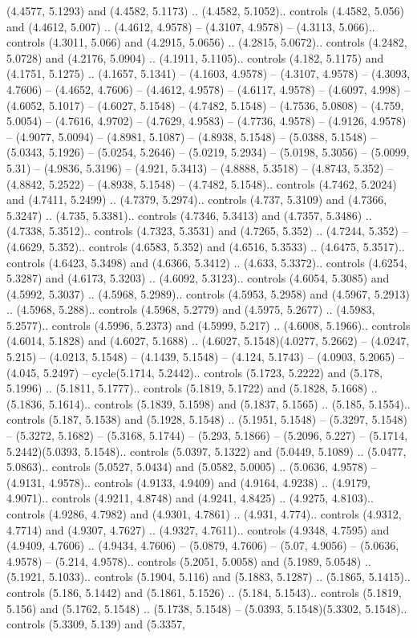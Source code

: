 (4.4577, 5.1293) and (4.4582, 5.1173) .. (4.4582, 5.1052).. controls (4.4582, 5.056) and (4.4612, 5.007) .. (4.4612, 4.9578) -- (4.3107, 4.9578) -- (4.3113, 5.066).. controls (4.3011, 5.066) and (4.2915, 5.0656) .. (4.2815, 5.0672).. controls (4.2482, 5.0728) and (4.2176, 5.0904) .. (4.1911, 5.1105).. controls (4.182, 5.1175) and (4.1751, 5.1275) .. (4.1657, 5.1341) -- (4.1603, 4.9578) -- (4.3107, 4.9578) -- (4.3093, 4.7606) -- (4.4652, 4.7606) -- (4.4612, 4.9578) -- (4.6117, 4.9578) -- (4.6097, 4.998) -- (4.6052, 5.1017) -- (4.6027, 5.1548) -- (4.7482, 5.1548) -- (4.7536, 5.0808) -- (4.759, 5.0054) -- (4.7616, 4.9702) -- (4.7629, 4.9583) -- (4.7736, 4.9578) -- (4.9126, 4.9578) -- (4.9077, 5.0094) -- (4.8981, 5.1087) -- (4.8938, 5.1548) -- (5.0388, 5.1548) -- (5.0343, 5.1926) -- (5.0254, 5.2646) -- (5.0219, 5.2934) -- (5.0198, 5.3056) -- (5.0099, 5.31) -- (4.9836, 5.3196) -- (4.921, 5.3413) -- (4.8888, 5.3518) -- (4.8743, 5.352) -- (4.8842, 5.2522) -- (4.8938, 5.1548) -- (4.7482, 5.1548).. controls (4.7462, 5.2024) and (4.7411, 5.2499) .. (4.7379, 5.2974).. controls (4.737, 5.3109) and (4.7366, 5.3247) .. (4.735, 5.3381).. controls (4.7346, 5.3413) and (4.7357, 5.3486) .. (4.7338, 5.3512).. controls (4.7323, 5.3531) and (4.7265, 5.352) .. (4.7244, 5.352) -- (4.6629, 5.352).. controls (4.6583, 5.352) and (4.6516, 5.3533) .. (4.6475, 5.3517).. controls (4.6423, 5.3498) and (4.6366, 5.3412) .. (4.633, 5.3372).. controls (4.6254, 5.3287) and (4.6173, 5.3203) .. (4.6092, 5.3123).. controls (4.6054, 5.3085) and (4.5992, 5.3037) .. (4.5968, 5.2989).. controls (4.5953, 5.2958) and (4.5967, 5.2913) .. (4.5968, 5.288).. controls (4.5968, 5.2779) and (4.5975, 5.2677) .. (4.5983, 5.2577).. controls (4.5996, 5.2373) and (4.5999, 5.217) .. (4.6008, 5.1966).. controls (4.6014, 5.1828) and (4.6027, 5.1688) .. (4.6027, 5.1548)(4.0277, 5.2662) -- (4.0247, 5.215) -- (4.0213, 5.1548) -- (4.1439, 5.1548) -- (4.124, 5.1743) -- (4.0903, 5.2065) -- (4.045, 5.2497) -- cycle(5.1714, 5.2442).. controls (5.1723, 5.2222) and (5.178, 5.1996) .. (5.1811, 5.1777).. controls (5.1819, 5.1722) and (5.1828, 5.1668) .. (5.1836, 5.1614).. controls (5.1839, 5.1598) and (5.1837, 5.1565) .. (5.185, 5.1554).. controls (5.187, 5.1538) and (5.1928, 5.1548) .. (5.1951, 5.1548) -- (5.3297, 5.1548) -- (5.3272, 5.1682) -- (5.3168, 5.1744) -- (5.293, 5.1866) -- (5.2096, 5.227) -- (5.1714, 5.2442)(5.0393, 5.1548).. controls (5.0397, 5.1322) and (5.0449, 5.1089) .. (5.0477, 5.0863).. controls (5.0527, 5.0434) and (5.0582, 5.0005) .. (5.0636, 4.9578) -- (4.9131, 4.9578).. controls (4.9133, 4.9409) and (4.9164, 4.9238) .. (4.9179, 4.9071).. controls (4.9211, 4.8748) and (4.9241, 4.8425) .. (4.9275, 4.8103).. controls (4.9286, 4.7982) and (4.9301, 4.7861) .. (4.931, 4.774).. controls (4.9312, 4.7714) and (4.9307, 4.7627) .. (4.9327, 4.7611).. controls (4.9348, 4.7595) and (4.9409, 4.7606) .. (4.9434, 4.7606) -- (5.0879, 4.7606) -- (5.07, 4.9056) -- (5.0636, 4.9578) -- (5.214, 4.9578).. controls (5.2051, 5.0058) and (5.1989, 5.0548) .. (5.1921, 5.1033).. controls (5.1904, 5.116) and (5.1883, 5.1287) .. (5.1865, 5.1415).. controls (5.186, 5.1442) and (5.1861, 5.1526) .. (5.184, 5.1543).. controls (5.1819, 5.156) and (5.1762, 5.1548) .. (5.1738, 5.1548) -- (5.0393, 5.1548)(5.3302, 5.1548).. controls (5.3309, 5.139) and (5.3357, 